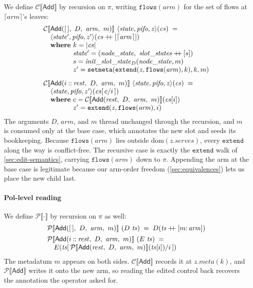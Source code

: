 \documentclass[sigplan,anonymous,review,nonacm]{acmart}
\newcommand{\csem}[1]{\mathcal{C}\llbracket #1 \rrbracket}
\newcommand{\psem}[1]{\mathcal{P}\llbracket #1 \rrbracket}
\newcommand{\notation}[1]{\ensuremath{#1}\ifmmode\else\xspace\fi}
\newcommand{\arm}{\notation{\mathit{arm}}}
\newcommand{\disc}{\notation{D}}
\newcommand{\Add}{\textsf{Add}}
\begin{document}
We define \(\csem{\Add}\) by recursion on \(\pi\), writing \(\mathtt{flows}(\mathit{arm})\) for the set of flows at \(\lceil \mathit{arm} \rceil\)'s leaves:
{\small
\[
\begin{array}{@{}l@{}}
\csem{\Add([\,],\ D,\ \mathit{arm},\ m)}\ \langle\mathit{state},\mathit{pifo},\mathit{z}\rangle(\mathit{cs}) \;=\\
\quad \langle\mathit{state'},\mathit{pifo},z'\rangle(\mathit{cs}\mathbin{+\!\!+}[\lceil\mathit{arm}\rceil])\\
\quad \textbf{where}\ k=|\mathit{cs}|\\
\quad \phantom{\textbf{where}}\ \mathit{state'}=(\mathit{node\_state},\ \mathit{slot\_states}\mathbin{+\!\!+}[s])\\
\quad \phantom{\textbf{where}}\ s=\mathit{init\_slot\_state}_{D}(\mathit{node\_state},m)\\
\quad \phantom{\textbf{where}}\ z'=\mathtt{setmeta}(\mathtt{extend}(\mathit{z},\mathtt{flows}(\mathit{arm}),k),k,m)\\[8pt]
\csem{\Add(i\mathbin{::}\mathit{rest},\ D,\ \mathit{arm},\ m)}\ \langle\mathit{state},\mathit{pifo},\mathit{z}\rangle(\mathit{cs}) \;=\\
\quad \langle\mathit{state},\mathit{pifo},z'\rangle(\mathit{cs}[\,c/i\,])\\
\quad \textbf{where}\ c=\csem{\Add(\mathit{rest},\ D,\ \mathit{arm},\ m)}(\mathit{cs}[i])\\
\quad \phantom{\textbf{where}}\ z'=\mathtt{extend}(\mathit{z},\mathtt{flows}(\mathit{arm}),i)
\end{array}
\]
}
The arguments \disc, \arm, and \(m\) thread unchanged through the recursion, and \(m\) is consumed only at the base case, which annotates the new slot and seeds its bookkeeping.
Because \(\mathtt{flows}(\mathit{arm})\) lies outside \(\mathrm{dom}(\mathit{z}.\mathit{serves})\), every \(\mathtt{extend}\) along the way is conflict-free.
The recursive case is exactly the \(\mathtt{extend}\) walk of \cref{sec:edit-semantics}, carrying \(\mathtt{flows}(\mathit{arm})\) down to \(\pi\).
Appending the arm at the base case is legitimate because our arm-order freedom (\cref{sec:equivalences}) lets us place the new child last.

\paragraph{Pol-level reading}

We define \(\psem{\cdot}\) by recursion on \(\pi\) as well:
{\small
\[
\begin{array}{@{}l@{}}
\psem{\Add([\,],\ D,\ \mathit{arm},\ m)}\ (D\ \mathit{ts}) \;=\; D(\mathit{ts}\mathbin{+\!\!+}[m{:}\,\mathit{arm}])\\[4pt]
\psem{\Add(i\mathbin{::}\mathit{rest},\ D,\ \mathit{arm},\ m)}\ (E\ \mathit{ts}) \;=\\
\quad E(\mathit{ts}[\,\psem{\Add(\mathit{rest},\ D,\ \mathit{arm},\ m)}(\mathit{ts}[i])/i\,])
\end{array}
\]
}
The metadatum \(m\) appears on both sides.
\(\csem{\Add}\) records it at \(\mathit{z}.\mathit{meta}(k)\), and \(\psem{\Add}\) writes it onto the new arm, so reading the edited control back recovers the annotation the operator asked for.
\end{document}
